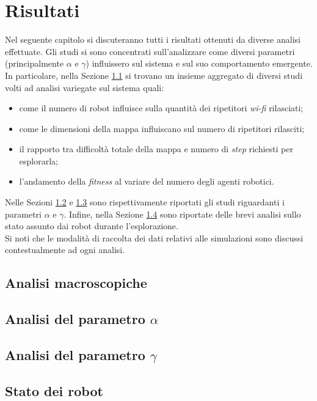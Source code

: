 \chapter{Risultati}
\label{chap:results}
Nel seguente capitolo si discuteranno tutti i risultati ottenuti da diverse analisi effettuate.
Gli studi si sono concentrati sull'analizzare come diversi parametri (principalmente $\alpha$ e $\gamma$) influissero sul sistema e sul suo comportamento emergente.
In particolare, nella Sezione \ref{sec:results-macro} si trovano un insieme aggregato di diversi studi volti ad analisi variegate sul sistema quali:\begin{itemize}
	\item come il numero di robot influisce sulla quantità dei ripetitori \textit{wi-fi} rilasciati;
	\item come le dimensioni della mappa influiscano sul numero di ripetitori rilasciti;
	\item il rapporto tra difficoltà totale della mappa e numero di \textit{step} richiesti per esplorarla;
	\item l'andamento della \textit{fitness} al variare del numero degli agenti robotici.
\end{itemize}
Nelle Sezioni \ref{sec:alpha} e \ref{sec:gamma} sono rispettivamente riportati gli studi riguardanti i parametri $\alpha$ e $\gamma$.
Infine, nella Sezione \ref{sec:status} sono riportate delle brevi analisi sullo stato assunto dai robot durante l'esplorazione.\\
Si noti che le modalità di raccolta dei dati relativi alle simulazioni sono discussi contestualmente ad ogni analisi.
\section{Analisi macroscopiche}
\label{sec:results-macro}

\section{Analisi del parametro $\alpha$}
\label{sec:alpha}

\section{Analisi del parametro $\gamma$}
\label{sec:gamma}

\newpage
\section{Stato dei robot}
\label{sec:status}
